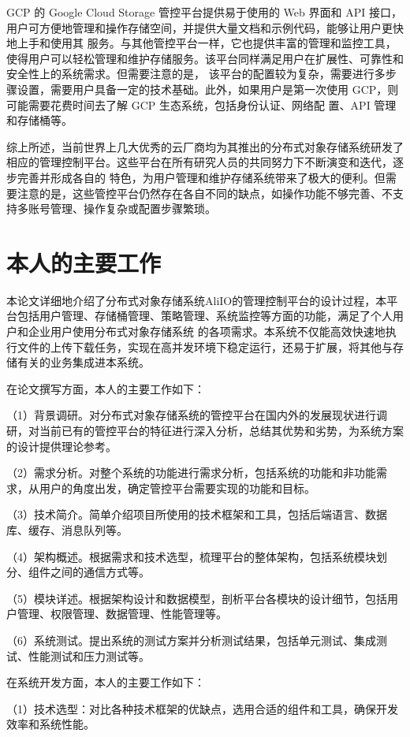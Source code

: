 GCP 的 Google Cloud Storage 管控平台提供易于使用的 Web 界面和 API 接口\cite{kon2eji}，用户可方便地管理和操作存储空间，并提供大量文档和示例代码，能够让用户更快地上手和使用其
服务。与其他管控平台一样，它也提供丰富的管理和监控工具，使得用户可以轻松管理和维护存储服务。该平台同样满足用户在扩展性、可靠性和安全性上的系统需求。但需要注意的是，
该平台的配置较为复杂，需要进行多步骤设置，需要用户具备一定的技术基础。此外，如果用户是第一次使用 GCP，则可能需要花费时间去了解 GCP 生态系统，包括身份认证、网络配
置、API 管理和存储桶等。

综上所述，当前世界上几大优秀的云厂商均为其推出的分布式对象存储系统研发了相应的管理控制平台。这些平台在所有研究人员的共同努力下不断演变和迭代，逐步完善并形成各自的
特色，为用户管理和维护存储系统带来了极大的便利。但需要注意的是，这些管控平台仍然存在各自不同的缺点，如操作功能不够完善、不支持多账号管理、操作复杂或配置步骤繁琐。

\section{本人的主要工作}

本论文详细地介绍了分布式对象存储系统AliIO的管理控制平台的设计过程，本平台包括用户管理、存储桶管理、策略管理、系统监控等方面的功能，满足了个人用户和企业用户使用分布式对象存储系统
的各项需求。本系统不仅能高效快速地执行文件的上传下载任务，实现在高并发环境下稳定运行，还易于扩展，将其他与存储有关的业务集成进本系统。

在论文撰写方面，本人的主要工作如下：

（1）背景调研。对分布式对象存储系统的管控平台在国内外的发展现状进行调研，对当前已有的管控平台的特征进行深入分析，总结其优势和劣势，为系统方案的设计提供理论参考。

（2）需求分析。对整个系统的功能进行需求分析，包括系统的功能和非功能需求，从用户的角度出发，确定管控平台需要实现的功能和目标。

（3）技术简介。简单介绍项目所使用的技术框架和工具，包括后端语言、数据库、缓存、消息队列等。

（4）架构概述。根据需求和技术选型，梳理平台的整体架构，包括系统模块划分、组件之间的通信方式等。

（5）模块详述。根据架构设计和数据模型，剖析平台各模块的设计细节，包括用户管理、权限管理、数据管理、性能管理等。

（6）系统测试。提出系统的测试方案并分析测试结果，包括单元测试、集成测试、性能测试和压力测试等。

在系统开发方面，本人的主要工作如下：

（1）技术选型：对比各种技术框架的优缺点，选用合适的组件和工具，确保开发效率和系统性能。

